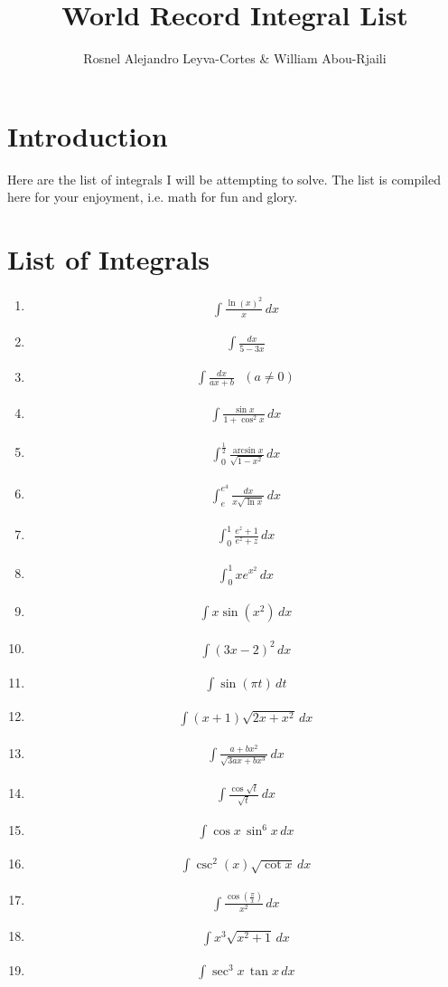 \documentclass[twoside, fleqn,12pt, letterpaper]{article}
\title{\textbf{World Record Integral List}}
\author{Rosnel Alejandro Leyva-Cortes \& William Abou-Rjaili}
\newcommand{\makeitem}[1]{\item \begin{align*} {#1}
  \end{align*}}
\begin{document}
\maketitle

\section*{Introduction}
Here are the list of integrals I will be attempting to solve. 
The list is compiled here for your enjoyment, i.e. math for fun and glory.



\section*{List of Integrals}
\begin{multicols}{2}
\begin{enumerate}

  \makeitem {\int\frac{\ln(x)^2}{x}\,dx}
  
  \makeitem { \int\frac{dx}{5-3x}}
  
 \makeitem{\int\frac{dx}{ax+b}\,\,\,\, (a \neq 0)}
  
  \makeitem{\int\frac{\sin x}{1+\cos^2 x} \, dx}
  
  \makeitem{\int_{0}^{\frac{1}{2}}\frac{\arcsin x}{\sqrt{1-x^2}} \, dx}
  
  \makeitem{\int_{e}^{e^4}\frac{dx}{x\sqrt{\ln x}} \, dx}
  
  \makeitem{\int_{0}^{1}\frac{e^z+1}{e^z+z} \, dx}
  
  \makeitem{\int_{0}^{1}xe^{x^2} \, dx}
  
  \makeitem{\int x\sin(x^2) \, dx}
  
  \makeitem{\int (3x-2)^2 \, dx}
  
  \makeitem{\int \sin(\pi t) \, dt}
  
  \makeitem{\int (x+1)\sqrt{2x+x^2} \, dx}
  
  \makeitem{\int\frac{a+bx^2}{\sqrt{3ax+bx^3}} \, dx}
  
  \makeitem{\int\frac{\cos\sqrt{t}}{\sqrt{t}}\, dx}
  
 \makeitem{\int \cos x \, \sin^6 x \, dx}
  
  \makeitem{\int \csc^2(x)\sqrt{\cot x} \, dx}
  
 \makeitem{\int\frac{\cos\left(\frac{\pi}{x}\right)}{x^2} \, dx}
  
  \makeitem{\int x^3\sqrt{x^2+1} \, dx}
  
  \makeitem{\int \sec^3 x\,\tan x \, dx}
  

\end{enumerate}
\end{multicols}
\end{document}
